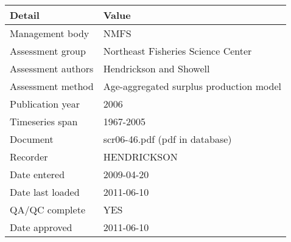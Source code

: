 \begin{table}[htb]
\centering
\begin{tabular}{lp{7cm}}
\toprule
Detail & Value \\
\midrule
Management body    & NMFS                                    \\
Assessment group   & Northeast Fisheries Science Center      \\
Assessment authors & Hendrickson and Showell                 \\
Assessment method  & Age-aggregated surplus production model \\
Publication year   & 2006                                    \\
Timeseries span    & 1967-2005                               \\
Document           & scr06-46.pdf (pdf in database)          \\
Recorder           & HENDRICKSON                             \\
Date entered       & 2009-04-20                              \\
Date last loaded   & 2011-06-10                              \\
QA/QC complete     & YES                                     \\
Date approved      & 2011-06-10                              \\
\bottomrule
\end{tabular}
\label{tab:assessdet}
\end{table}
